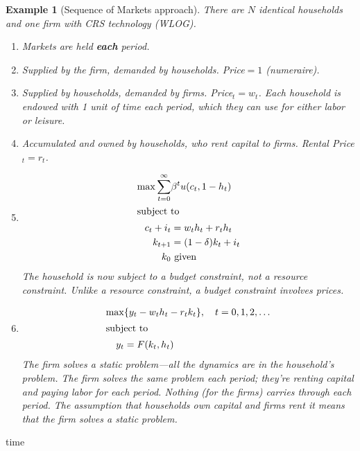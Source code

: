 \documentclass[11pt]{article}
\newtheorem*{example}{Example}
\begin{document}
\begin{example}[Sequence of Markets approach]
There are \(N\) identical households and one firm with CRS technology (WLOG).
\begin{enumerate}
\item[\textbf{Markets.}] Markets are held \textbf{each} period.
\item[\textbf{Goods.}] Supplied by the firm, demanded by households. Price$= 1$ (numeraire).
\item[\textbf{Labor.}] Supplied by households, demanded by firms. Price$_t = w_t$. Each household is endowed with 1 unit of time each period, which they can use for either labor or leisure.
\item[\textbf{Capital.}] Accumulated and owned by households, who rent capital to firms. Rental Price$_t = r_t$.
\item[\begin{tabular}{r}\textbf{Household's}\\ \textbf{Problem.}\end{tabular}]
\begin{align*}
\max \sum^\infty_{t = 0} & \beta^t u(c_t, 1 - h_t)\\
\intertext{subject to}
c_t + i_t &= w_t h_t + r_t h_t\\
k_{t + 1} &= (1 - \delta)k_t + i_t\\
k_0 &\text{ given}
\end{align*}
The household is now subject to a budget constraint, not a resource constraint. Unlike a resource constraint, a budget constraint involves prices.
\item[\textbf{Firm's Problem.}]
\begin{align*}
\max &\{y_t - w_t h_t - r_t k_t\},\quad t = 0, 1, 2, \ldots\\
\intertext{subject to}
y_t &= F(k_t, h_t)
\end{align*}
The firm solves a static problem---all the dynamics are in the household's problem. The firm solves the same problem each period; they're renting capital and paying labor for each period. Nothing (for the firms) carries through each period. The assumption that households own capital and firms rent it means that the firm solves a static problem.
\end{enumerate}
\end{example}time
\end{document}
